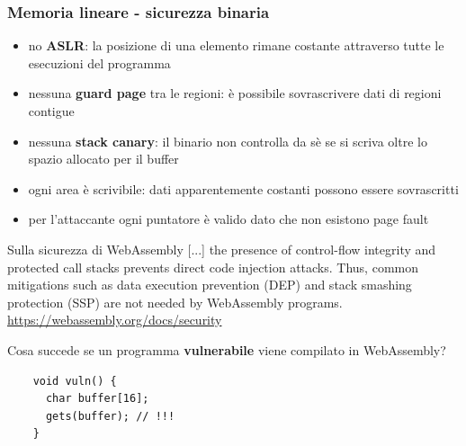 \documentclass{beamer}
\begin{document}
\begin{frame}
  \frametitle{Memoria lineare - sicurezza binaria}
  \begin{itemize}
    \item no \textbf{ASLR}: la posizione di una elemento rimane costante
      attraverso tutte le esecuzioni del programma
    \pause
    \item nessuna \textbf{guard page} tra le regioni: è possibile
      sovrascrivere dati di regioni contigue
    \pause
    \item nessuna \textbf{stack canary}: il binario non controlla da sè se si scriva
      oltre lo spazio
      allocato per il buffer
    \pause
    \item ogni area è scrivibile: dati apparentemente costanti possono essere
      sovrascritti
    \pause
    \item per l'attaccante ogni puntatore è valido dato che non esistono page fault
  \end{itemize}
\end{frame}

\begin{frame}[fragile]
  \begin{block}{Sulla sicurezza di WebAssembly} 
    [...] the presence of control-flow integrity and protected call stacks prevents direct code injection attacks. Thus, common mitigations such as data execution prevention (DEP) and stack smashing protection (SSP) are not needed by WebAssembly programs.
    \newline\newline\url{https://webassembly.org/docs/security} 
  \end{block}
  \pause
  Cosa succede se un programma \textbf{vulnerabile} viene compilato in WebAssembly?
\newline
  \begin{verbatim}
    void vuln() {
      char buffer[16];
      gets(buffer); // !!!
    }
  \end{verbatim}
  \end{frame}
\end{document}
